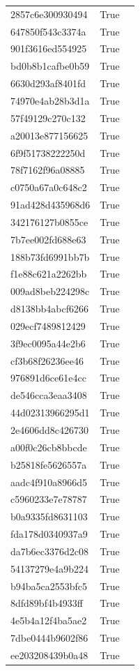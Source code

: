 \begin{tabular}{lrl}
2857c6e300930494 & True &  \\
647850f543c3374a & True &  \\
901f3616ed554925 & True &  \\
bd0b8b1cafbe0b59 & True &  \\
6630d293af8401fd & True &  \\
74970e4ab28b3d1a & True &  \\
57f49129c270c132 & True &  \\
a20013e877156625 & True &  \\
6f9f51738222250d & True &  \\
78f7162f96a08885 & True &  \\
c0750a67a0c648c2 & True &  \\
91ad428d435968d6 & True &  \\
342176127b0855ce & True &  \\
7b7ee002fd688e63 & True &  \\
188b73fd6991bb7b & True &  \\
f1e88c621a2262bb & True &  \\
009ad8beb224298c & True &  \\
d8138bb4abcf6266 & True &  \\
029ecf7489812429 & True &  \\
3f9ec0095a44e2b6 & True &  \\
cf3b68f26236ee46 & True &  \\
976891d6ce61e4cc & True &  \\
de546cca3eaa3408 & True &  \\
44d02313966295d1 & True &  \\
2e4606dd8c426730 & True &  \\
a00f0c26cb8bbcde & True &  \\
b25818fe5626557a & True &  \\
aadc4f910a8966d5 & True &  \\
c5960233e7e78787 & True &  \\
b0a9335fd8631103 & True &  \\
fda178d0340937a9 & True &  \\
da7b6ec3376d2c08 & True &  \\
54137279e4a9b224 & True &  \\
b94ba5ca2553bfc5 & True &  \\
8dfd89bf4b4933ff & True &  \\
4e5b4a12f4ba5ae2 & True &  \\
7dbe0444b9602f86 & True &  \\
ee203208439b0a48 & True &  \\

\end{tabular}
